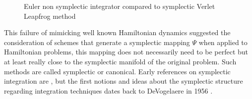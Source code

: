 \begin{figure}[H]%
    \centering
    \qquad
    \caption{Euler non symplectic integrator compared to symplectic Verlet Leapfrog method}%
    \label{fig:euler}%
\end{figure}

This failure of mimicking well known Hamiltonian dynamics suggested the consideration of schemes that generate a symplectic mapping $\Psi$ when applied to Hamiltonian problems, this mapping does not necessarily need to be perfect but at least really close to the symplectic manifold of the original problem. Such methods are called symplectic or canonical. Early references on symplectic integration are \cite{ruth1983canonical}\cite{channell1983symplectic}\cite{menyuk1984some}\cite{feng2010symplectic}\cite{kang1991symplectic}, but the first notions and ideas about the symplectic structure regarding integration techniques dates back to DeVogelaere in 1956 \cite{channell1990symplectic}.




